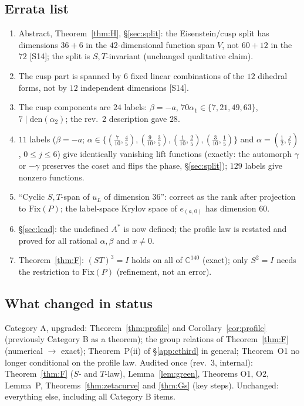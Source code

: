 \documentclass[11pt]{article}
\theoremstyle{definition}
\newcommand{\C}{\mathbb{C}}
\newcommand{\src}[1]{\textup{[S#1]}}
\begin{document}
\subsection{Errata list}
\begin{enumerate}[label=\textbf{R3.\arabic*},leftmargin=3.2em]
\item Abstract, Theorem~\ref{thm:H}, \S\ref{sec:split}: the Eisenstein/cusp split has dimensions $36+6$ in the $42$-dimensional function span $V$, not $60+12$ in
the $72$ \src{14}; the split is $S,T$-invariant (unchanged qualitative claim).
\item The cusp part is spanned by $6$ fixed linear combinations of the $12$ dihedral forms, not by $12$ independent dimensions \src{14}.
\item The cusp components are $24$ labels: $\beta=-a$, $70\alpha_1\in\{7,21,49,63\}$, $7\mid\mathrm{den}(\alpha_2)$; the rev.~2 description gave $28$.
\item $11$ labels ($\beta=-a$; $\alpha\in\{(\tfrac7{10},\tfrac45),(\tfrac9{10},\tfrac35),(\tfrac1{10},\tfrac25),(\tfrac3{10},\tfrac15)\}$ and $\alpha=(\tfrac12,\tfrac j7)$, $0\le j\le6$) give
identically vanishing lift functions (exactly: the automorph $\gamma$ or $-\gamma$ preserves the coset and flips the phase, \S\ref{sec:split}); $129$ labels give nonzero functions.
\item ``Cyclic $S,T$-span of $u_L$ of dimension $36$'': correct as the rank after projection to $\mathrm{Fix}(P)$; the label-space Krylov space of $e_{(a,0)}$ has
dimension $60$.
\item \S\ref{sec:lead}: the undefined $A^*$ is now defined; the profile law is restated and proved for all rational $\alpha,\beta$ and $x\neq0$.
\item Theorem~\ref{thm:F}: $(ST)^3=I$ holds on all of $\C^{140}$ (exact); only $S^2=I$ needs the restriction to $\mathrm{Fix}(P)$ (refinement, not an error).
\end{enumerate}

\subsection{What changed in status}
Category A, upgraded: Theorem~\ref{thm:profile} and Corollary~\ref{cor:profile} (previously Category B as a theorem); the group relations of
Theorem~\ref{thm:F} (numerical $\to$ exact); Theorem~P(ii) of \S\ref{app:cthird} in general; Theorem~O1 no longer conditional on the profile law.
Audited once (rev.~3, internal): Theorem~\ref{thm:F} ($S$- and $T$-law), Lemma~\ref{lem:green}, Theorems O1, O2, Lemma~P, Theorems~\ref{thm:zetacurve} and
\ref{thm:Gs} (key steps). Unchanged: everything else, including all Category B items.
\end{document}

